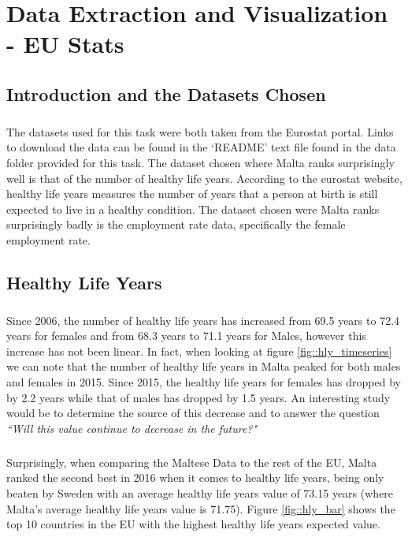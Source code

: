 \chapter{Data Extraction and Visualization - EU Stats}

\section{Introduction and the Datasets Chosen}
\paragraph{ }The datasets used for this task were both taken from the Eurostat portal. Links to download the data can be found in the `README' text file found in the data folder provided for this task. The dataset chosen where Malta ranks surprisingly well is that of the number of healthy life years. According to the eurostat website, healthy life years measures the number of years that a person at birth is still expected to live in a healthy condition. The dataset chosen were Malta ranks surprisingly badly is the employment rate data, specifically the female employment rate.

\section{Healthy Life Years}
\paragraph{ }Since 2006, the number of healthy life years has increased from 69.5 years to 72.4 years for females and from 68.3 years to 71.1 years for Males, however this increase has not been linear. In fact, when looking at figure \ref{fig::hly_timeseries} we can note that the number of healthy life years in Malta peaked for both males and females in 2015. Since 2015, the healthy life years for females has dropped by by 2.2 years while that of males has dropped by 1.5 years. An interesting study would be to determine the source of this decrease and to answer the question \textit{``Will this value continue to decrease in the future?"} 

\paragraph{ }Surprisingly, when comparing the Maltese Data to the rest of the EU, Malta ranked the second best in 2016 when it comes to healthy life years, being only beaten by Sweden with an average healthy life years value of 73.15 years (where Malta's average healthy life years value is 71.75). Figure \ref{fig::hly_bar} shows the top 10 countries in the EU with the highest healthy life years expected value.

